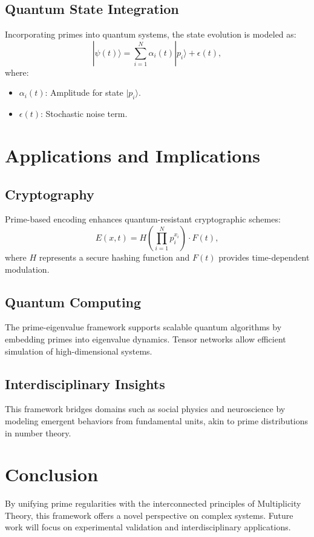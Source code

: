 \documentclass{article}
\theoremstyle{plain}
\begin{document}
\subsection{Quantum State Integration}
Incorporating primes into quantum systems, the state evolution is modeled as:
\begin{equation}
|\psi(t)\rangle = \sum_{i=1}^N \alpha_i(t) |p_i\rangle + \epsilon(t),
\end{equation}
where:
\begin{itemize}
    \item $\alpha_i(t)$: Amplitude for state $|p_i\rangle$.
    \item $\epsilon(t)$: Stochastic noise term.
\end{itemize}

\section{Applications and Implications}

\subsection{Cryptography}
Prime-based encoding enhances quantum-resistant cryptographic schemes:
\begin{equation}
E(x,t) = H\left(\prod_{i=1}^N p_i^{x_i}\right) \cdot F(t),
\end{equation}
where $H$ represents a secure hashing function and $F(t)$ provides time-dependent modulation.

\subsection{Quantum Computing}
The prime-eigenvalue framework supports scalable quantum algorithms by embedding primes into eigenvalue dynamics. Tensor networks allow efficient simulation of high-dimensional systems.

\subsection{Interdisciplinary Insights}
This framework bridges domains such as social physics and neuroscience by modeling emergent behaviors from fundamental units, akin to prime distributions in number theory.

\section{Conclusion}
By unifying prime regularities with the interconnected principles of Multiplicity Theory, this framework offers a novel perspective on complex systems. Future work will focus on experimental validation and interdisciplinary applications.


\nocite{*}


\end{document}
